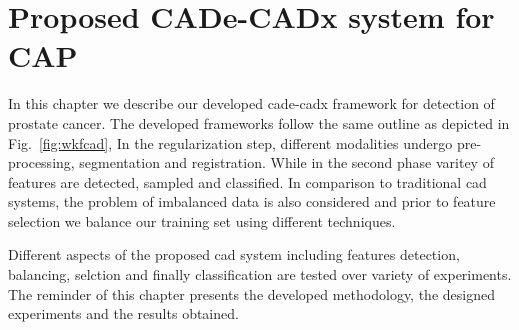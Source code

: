 \chapter{Proposed CADe-CADx system for CAP}\label{chap:6}
In this chapter we describe our developed \ac{cade}-\ac{cadx} framework for detection of prostate cancer.
The developed frameworks follow the same outline as depicted in Fig.~\ref{fig:wkfcad}, 
In the regularization step, different modalities undergo pre-processing, segmentation and registration. 
While in the second phase varitey of features are detected, sampled and classified.
In comparison to traditional \ac{cad} systems, the problem of imbalanced data is also considered and prior to feature selection we balance our training set using different techniques.

Different aspects of the proposed \ac{cad} system including features detection, balancing, selction and finally classification are tested over variety of experiments.
The reminder of this chapter presents the developed methodology, the designed experiments and the results obtained.





